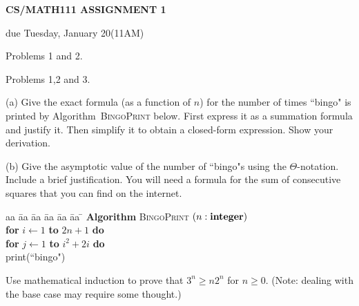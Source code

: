 \documentclass{article}
\begin{document}
\centerline{\large \bf CS/MATH111 ASSIGNMENT 1}
\centerline{due Tuesday, January 20(11AM)}

\vskip 0.1in
 Problems 1 and 2.

 Problems 1,2 and 3.

\vskip 0.2in


\begin{problem}
(a)
Give the exact formula (as a function of $n$) for the number of
times ``bingo" is printed by Algorithm~\textsc{BingoPrint} below.
First express it as a summation formula and justify it. Then simplify it to 
obtain a closed-form expression. Show your derivation.

\noindent
(b)
Give the asymptotic value of the
number of ``bingo"s using the $\Theta$-notation. Include a brief justification. You will need a formula
for the sum of consecutive squares that you can find on the internet.

\begin{tabbing}
aa \= aa \= aa \= aa \= aa \= aa \= \kill
\textbf{Algorithm} \textsc{BingoPrint} $(n: \mbox{\bf integer})$ \\
      \> \textbf{for} $i \leftarrow 1$ \textbf{to} $2n+1$
                         \textbf{do} \\
      \> \> \textbf{for} $j \leftarrow 1$ \textbf{to} $i^2+2i$ \textbf{do} \\
      \> \> \> print(``bingo")
\end{tabbing}
\end{problem}


\begin{problem}
Use mathematical induction to prove that $3^n \ge n2^n$ for $n\ge 0$. 
(Note: dealing with the base case may require some thought.)
\end{problem}
\end{document}
